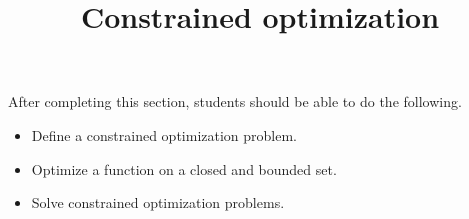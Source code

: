 \documentclass{ximera}
\title{Constrained optimization}
\begin{document}
\begin{abstract}
\end{abstract}

\maketitle

\begin{sectionOutcomes}

After completing this section, students should be able to do the following.

\begin{itemize}
\item Define a constrained optimization problem.
\item Optimize a function on a closed and bounded set.
\item Solve constrained optimization problems.
\end{itemize}

\end{sectionOutcomes}
\end{document}

